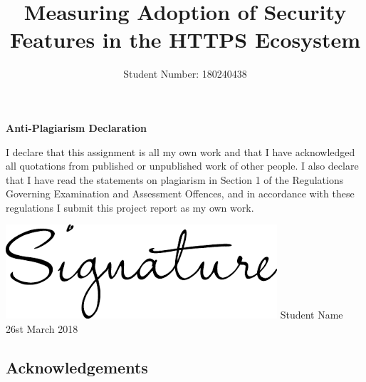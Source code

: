 \documentclass{mscreport}
\begin{document}
\author{Student Number: 180240438	}
\title{Measuring Adoption of Security Features in the HTTPS Ecosystem}

\maketitle 


\begin{center}
    {\Large\bfseries Anti-Plagiarism Declaration}
    \vspace{1cm}
\begin{enumerate}

I declare that this assignment is all my own work and that I have acknowledged all quotations from published or unpublished work of other people.  I also declare that I have read the statements on plagiarism in Section 1 of the Regulations Governing Examination and Assessment Offences, and in accordance with these regulations I submit this project report as my own work.

\begin{flushleft}
\includegraphics[scale=0.21]{../images/signature.png} %
\newline
  \begingroup
    \noindent\textsf{Student Name} \vspace{0.5cm}\\
    \noindent\textsf{26st March 2018}
  \endgroup
  \end{flushleft}

\end{enumerate}
\end{center}

\newpage

\begin{center}
\section*{Acknowledgements}
\end{center}
\end{document}
